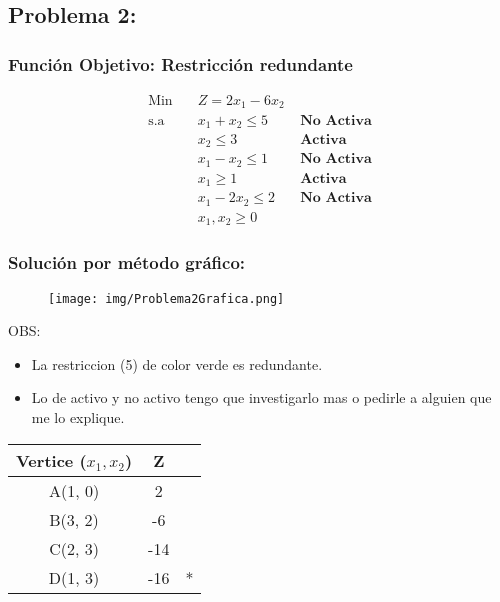 \documentclass{templateNote}
\begin{document}
\newpage
\subsection*{Problema 2:}
\subsubsection*{Función Objetivo: Restricción redundante}
\begin{equation*}
    \begin{aligned}
        \text{Min} \quad & Z = 2x_1 - 6x_2 \\
        \text{s.a} \quad & x_1 + x_2 \leq 5 \quad &\textbf{No Activa} \\
        & x_2 \leq 3 \quad &\textbf{Activa} \\
        & x_1 - x_2 \leq 1 \quad &\textbf{No Activa} \\
        & x_1 \geq 1 \quad &\textbf{Activa} \\
        & x_1 - 2x_2 \leq 2 \quad &\textbf{No Activa} \\
        &x_1,x_2 \geq 0
    \end{aligned}
\end{equation*}

\subsubsection*{Solución por método gráfico:}
\begin{figure}[H]
    \centering
    \texttt{[image: img/Problema2Grafica.png]}
\end{figure}
OBS:
\begin{itemize}
    \item La restriccion (5) de color verde es redundante.
    \item Lo de activo y no activo tengo que investigarlo mas o pedirle a alguien que me lo explique.
\end{itemize}
\begin{center}
    \begin{tabular}{|c|c|c|}
        \hline
        \textbf{Vertice ($x_1,x_2$)} & Z &  \\ \hline
        A(1, 0) & 2 & \\ \hline
        B(3, 2) & -6 & \\ \hline
        C(2, 3) & -14 & \\ \hline
        D(1, 3) & -16 & * \\ \hline
    \end{tabular}
\end{center}
\end{document}
